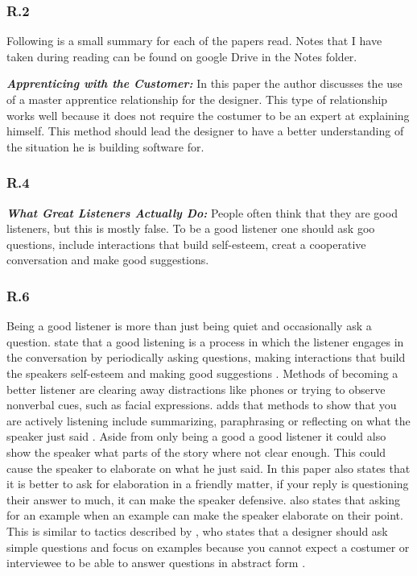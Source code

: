 \documentclass[]{article}
\begin{document}
\subsubsection*{R.2}
Following is a small summary for each of the papers read. 
Notes that I have taken during reading can be found on google Drive in the Notes folder.

\textbf{\textit{Apprenticing with the Customer: }}
In this paper the author discusses the use of a master apprentice relationship 
for the designer. This type of relationship works well because it does not require
the costumer to be an expert at explaining himself. This method should lead the 
designer to have a better understanding of the situation he is building software for.
   

\subsubsection*{R.4}
\textbf{\textit{What Great Listeners Actually Do: }}
People often think that they are good listeners, but this is mostly false.
To be a good listener one should ask goo questions, include interactions that
build self-esteem, creat a cooperative conversation and make good suggestions.

\subsubsection*{R.6}
Being a good listener is more than just being quiet and occasionally ask a question.
\citeauthor[]{zenger2016great} state that a good listening is a process in which 
the listener engages in the conversation by periodically asking questions, 
making interactions that build the speakers self-esteem and making
good suggestions \cite{zenger2016great}. Methods of becoming a better listener are 
clearing away distractions like phones or trying to observe nonverbal cues, 
such as facial expressions. \citeauthor[]{grohol2018become} adds that methods 
to show that you are actively listening include summarizing, paraphrasing or 
reflecting on what the speaker just said \cite{grohol2018become}. Aside from 
only being a good a good listener it could also show the speaker what parts 
of the story where not clear enough. This could cause the speaker to elaborate 
on what he just said. In this paper \citeauthor[]{grohol2018become} also states 
that it is better to ask for elaboration in a friendly matter, if your reply 
is questioning their answer to much, it can make the speaker defensive. 
\citeauthor[]{grohol2018become} also states that asking for an example when
an example can make the speaker elaborate on their point. This is similar to 
tactics described by \citeauthor[]{beyer1995apprenticing}, who states that 
a designer should ask simple questions and focus on examples because you cannot
expect a costumer or interviewee to be able to answer questions in abstract form \cite{beyer1995apprenticing}.
\end{document}
